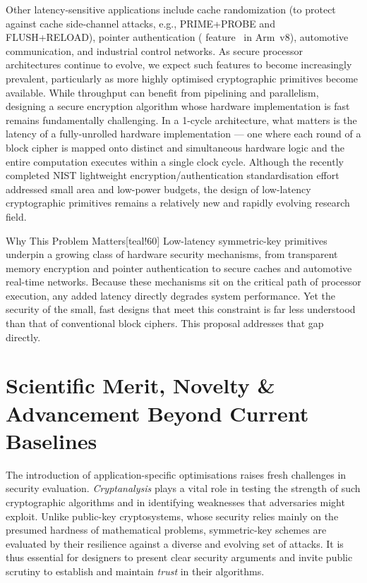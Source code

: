 Other latency-sensitive applications include cache randomization (to protect against cache side-channel attacks, e.g., \textsf{PRIME+PROBE} and \textsf{FLUSH+RELOAD}), pointer authentication ( feature~\cite{ARMv8-A-2016-additions} in Arm~v8), automotive communication, and industrial control networks.
As secure processor architectures continue to evolve, we expect such features to become increasingly prevalent, particularly as more highly optimised cryptographic primitives become available.
While throughput can benefit from pipelining and parallelism, designing a secure encryption algorithm whose hardware implementation is fast remains fundamentally challenging.
In a 1-cycle architecture, what matters is the latency of a fully-unrolled hardware implementation --- one where each round of a block cipher is mapped onto distinct and simultaneous hardware logic and the entire computation executes within a single clock cycle.
Although the recently completed NIST lightweight encryption/authentication standardisation effort addressed small area and low-power budgets, the design of low-latency cryptographic primitives remains a relatively new and rapidly evolving research field.

\begin{genericbox}{Why This Problem Matters}[teal!60]
Low-latency symmetric-key primitives underpin a growing class of hardware security mechanisms, from transparent memory encryption and pointer authentication to secure caches and automotive real-time networks.
Because these mechanisms sit on the critical path of processor execution, any added latency directly degrades system performance.
Yet the security of the small, fast designs that meet this constraint is far less understood than that of conventional block ciphers.
This proposal addresses that gap directly.
\end{genericbox}

\section{Scientific Merit, Novelty \& Advancement Beyond Current Baselines}

The introduction of application-specific optimisations raises fresh challenges in security evaluation.
\emph{Cryptanalysis} plays a vital role in testing the strength of such cryptographic algorithms and in identifying weaknesses that adversaries might exploit.
Unlike public-key cryptosystems, whose security relies mainly on the presumed hardness of mathematical problems, symmetric-key schemes are evaluated by their resilience against a diverse and evolving set of attacks.
It is thus essential for designers to present clear security arguments and invite public scrutiny to establish and maintain \emph{trust} in their algorithms.

